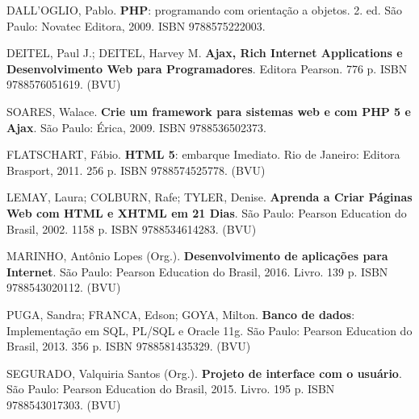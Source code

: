 \begin{pud}
\begin{bibbasica}
        \item DALL'OGLIO, Pablo. \textbf{PHP}: programando com orientação a objetos. 2. ed. São Paulo: Novatec Editora, 2009.  ISBN 9788575222003.
		\item DEITEL, Paul J.; DEITEL, Harvey M.  \textbf{Ajax, Rich Internet Applications e Desenvolvimento Web para Programadores}. Editora Pearson. 776 p. ISBN 9788576051619. (BVU)
		\item SOARES, Walace. \textbf{Crie um framework para sistemas web e com PHP 5 e Ajax}. São Paulo: Érica, 2009.  ISBN 9788536502373.
		
	\end{bibbasica}
	
	\begin{bibcomplementar}
    
	    
		\item FLATSCHART, F\'abio. \textbf{HTML 5}: embarque Imediato. Rio de Janeiro: Editora Brasport, 2011. 256 p. ISBN 9788574525778. (BVU)
		\item LEMAY, Laura; COLBURN, Rafe; TYLER, Denise. \textbf{Aprenda a Criar P\'aginas Web com HTML e XHTML em 21 Dias}.  São Paulo: Pearson Education do Brasil, 2002.  1158 p. ISBN 9788534614283. (BVU)
 		
 		\item MARINHO, Antônio Lopes (Org.). \textbf{Desenvolvimento de aplicações para Internet}. São Paulo: Pearson Education do Brasil, 2016. Livro. 139 p. ISBN 9788543020112. (BVU)
 		\item PUGA, Sandra; FRANCA, Edson; GOYA, Milton. \textbf{Banco de dados}: Implementa\c{c}\~ao em SQL, PL/SQL e Oracle 11g.  São Paulo: Pearson Education do Brasil, 2013. 356 p.  ISBN 9788581435329. (BVU)
 		\item SEGURADO, Valquiria Santos (Org.). \textbf{Projeto de interface com o usuário}. São Paulo: Pearson Education do Brasil, 2015. Livro. 195 p. ISBN 9788543017303. (BVU) 
		 
	\end{bibcomplementar}
	
	
	
\end{pud}
